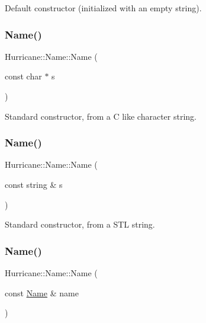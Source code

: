 Default constructor (initialized with an empty string). \mbox{\label{classHurricane_1_1Name_a754d54199d54c5e4568421c89f0682cb}} 
\subsubsection{\texorpdfstring{Name()}{Name()}\hspace{0.1cm}{\footnotesize\ttfamily [2/4]}}
{\footnotesize\ttfamily Hurricane\+::\+Name\+::\+Name (\begin{DoxyParamCaption}\item[{const char $\ast$}]{s }\end{DoxyParamCaption})}

Standard constructor, from a C like character string. \mbox{\label{classHurricane_1_1Name_a446df795ebe2e641710696bf775eb491}} 
\subsubsection{\texorpdfstring{Name()}{Name()}\hspace{0.1cm}{\footnotesize\ttfamily [3/4]}}
{\footnotesize\ttfamily Hurricane\+::\+Name\+::\+Name (\begin{DoxyParamCaption}\item[{const string \&}]{s }\end{DoxyParamCaption})}

Standard constructor, from a S\+TL string. \mbox{\label{classHurricane_1_1Name_a56ffee3e75dc343c7ec8b61102c1d3a2}} 
\subsubsection{\texorpdfstring{Name()}{Name()}\hspace{0.1cm}{\footnotesize\ttfamily [4/4]}}
{\footnotesize\ttfamily Hurricane\+::\+Name\+::\+Name (\begin{DoxyParamCaption}\item[{const \mbox{\hyperlink{classHurricane_1_1Name}{Name}} \&}]{name }\end{DoxyParamCaption})}

